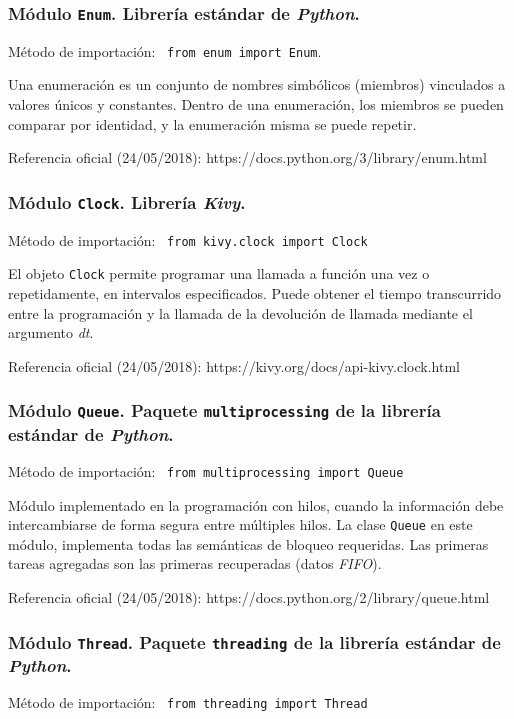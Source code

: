 \subsubsection{Módulo \texttt{Enum}. Librería estándar de \emph{Python}.}
Método de importación: ~\texttt{from enum import Enum}.

Una enumeración es un conjunto de nombres simbólicos (miembros) vinculados a valores únicos y constantes. Dentro de una enumeración, los miembros se pueden comparar por identidad, y la enumeración misma se puede repetir.

Referencia oficial (24/05/2018):  https://docs.python.org/3/library/enum.html

\subsubsection{Módulo \texttt{Clock}. Librería \emph{Kivy}.}
Método de importación: ~\texttt{from kivy.clock import Clock}

El objeto \texttt{Clock} permite programar una llamada a función una vez o repetidamente, en intervalos especificados. Puede obtener el tiempo transcurrido entre la programación y la llamada de la devolución de llamada mediante el argumento \emph{dt}.

Referencia oficial (24/05/2018):  https://kivy.org/docs/api-kivy.clock.html

\subsubsection{Módulo \texttt{Queue}. Paquete \texttt{multiprocessing} de la librería estándar de \emph{Python}.}
Método de importación: ~\texttt{from multiprocessing import Queue}

Módulo implementado en la programación con hilos, cuando la información debe intercambiarse de forma segura entre múltiples hilos. La clase \texttt{Queue} en este módulo, implementa todas las semánticas de bloqueo requeridas. Las primeras tareas agregadas son las primeras recuperadas (datos \emph{FIFO}).
 
Referencia oficial (24/05/2018): https://docs.python.org/2/library/queue.html

\subsubsection{Módulo \texttt{Thread}. Paquete \texttt{threading} de la librería estándar de \emph{Python}.}
Método de importación: ~\texttt{from threading import Thread}

